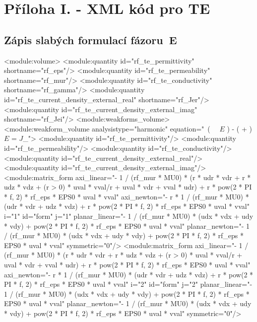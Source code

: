\documentclass[12pt,a4paper,oneside]{article}
\numberwithin{equation}{section} %
\numberwithin{figure}{section} %
\numberwithin{table}{section} %
\newcommand{\mj}{\mathrm{j}} %
\newcommand{\vecfaz}[1]{\mbox{\underline{\boldmath$#1$}}} %
\newcommand{\curl}{\mathrm{curl}\ }
\begin{document}
\newpage
\pagestyle{empty} %
\setcounter{page}{1} %
\appendix %
\section*{Příloha I. - XML kód pro TE}
\subsection*{Zápis slabých formulací fázoru~E}
\label{xmlE}
\begin{spverbatim}
  <module:volume>
    <module:quantity id="rf_te_permittivity" shortname="rf_eps"/>
    <module:quantity id="rf_te_permeability" shortname="rf_mur"/>
    <module:quantity id="rf_te_conductivity" shortname="rf_gamma"/>
    <module:quantity id="rf_te_current_density_external_real" shortname="rf_Jer"/>
    <module:quantity id="rf_te_current_density_external_imag" shortname="rf_Jei"/>
    <module:weakforms_volume>
      <module:weakform_volume analysistype="harmonic" equation="\curl \left( \, \curl \vecfaz{E} \right) - \mj \omega \left( \sigma + \mj \omega \varepsilon \right) \vecfaz{E} = \mj \omega \vecfaz{J}_{}">
        <module:quantity id="rf_te_permittivity"/>
        <module:quantity id="rf_te_permeability"/>
        <module:quantity id="rf_te_conductivity"/>
        <module:quantity id="rf_te_current_density_external_real"/>
        <module:quantity id="rf_te_current_density_external_imag"/>
        <module:matrix_form axi_linear="- 1 / (rf_mur * MU0) * (r * udr * vdr + r * udz * vdz + (r > 0) * uval * vval/r + uval * vdr + vval * udr) + r * pow(2 * PI * f, 2) * rf_eps * EPS0 * uval * vval" axi_newton="- r * 1 / (rf_mur * MU0) * (udr * vdr + udz * vdz) + r * pow(2 * PI * f, 2) * rf_eps * EPS0 * uval * vval" i="1" id="form" j="1" planar_linear="- 1 / (rf_mur * MU0) * (udx * vdx + udy * vdy) + pow(2 * PI * f, 2) * rf_eps * EPS0 * uval * vval" planar_newton="- 1 / (rf_mur * MU0) * (udx * vdx + udy * vdy) + pow(2 * PI * f, 2) * rf_eps * EPS0 * uval * vval" symmetric="0"/>
        <module:matrix_form axi_linear="- 1 / (rf_mur * MU0) * (r * udr * vdr + r * udz * vdz + (r > 0) * uval * vval/r + uval * vdr + vval * udr) + r * pow(2 * PI * f, 2) * rf_eps * EPS0 * uval * vval" axi_newton="- r * 1 / (rf_mur * MU0) * (udr * vdr + udz * vdz) + r * pow(2 * PI * f, 2) * rf_eps * EPS0 * uval * vval" i="2" id="form" j="2" planar_linear="- 1 / (rf_mur * MU0) * (udx * vdx + udy * vdy) + pow(2 * PI * f, 2) * rf_eps * EPS0 * uval * vval" planar_newton="- 1 / (rf_mur * MU0) * (udx * vdx + udy * vdy) + pow(2 * PI * f, 2) * rf_eps * EPS0 * uval * vval" symmetric="0"/>

\end{spverbatim}
\end{document}
